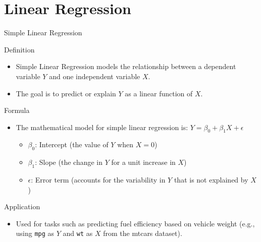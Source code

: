 \documentclass[
  18 pt,
  ignorenonframetext,
  aspectratio=1610,
]{beamer}
\providecommand{\tightlist}{%
  \setlength{\itemsep}{0pt}\setlength{\parskip}{0pt}}\usepackage{longtable,booktabs,array}
\begin{document}
\hypertarget{linear-regression}{%
\section{Linear Regression}\label{linear-regression}}

\begin{frame}[fragile]{Simple Linear Regression}
\protect\hypertarget{simple-linear-regression-1}{}
\begin{block}{Definition}
\protect\hypertarget{definition}{}
\begin{itemize}
\tightlist
\item
  Simple Linear Regression models the relationship between a dependent
  variable \(Y\) and one independent variable \(X\).
\item
  The goal is to predict or explain \(Y\) as a linear function of \(X\).
\end{itemize}
\end{block}

\begin{block}{Formula}
\protect\hypertarget{formula}{}
\begin{itemize}
\tightlist
\item
  The mathematical model for simple linear regression is:
  \(Y = \beta_0 + \beta_1 X + \epsilon\)

  \begin{itemize}
  \tightlist
  \item
    \(\beta_0\): Intercept (the value of \(Y\) when \(X = 0\))
  \item
    \(\beta_1\): Slope (the change in \(Y\) for a unit increase in
    \(X\))
  \item
    \(\epsilon\): Error term (accounts for the variability in \(Y\) that
    is not explained by \(X\))
  \end{itemize}
\end{itemize}
\end{block}

\begin{block}{Application}
\protect\hypertarget{application}{}
\begin{itemize}
\tightlist
\item
  Used for tasks such as predicting fuel efficiency based on vehicle
  weight (e.g., using \texttt{mpg} as \(Y\) and \texttt{wt} as \(X\)
  from the mtcars dataset).
\end{itemize}
\end{block}
\end{frame}
\end{document}
